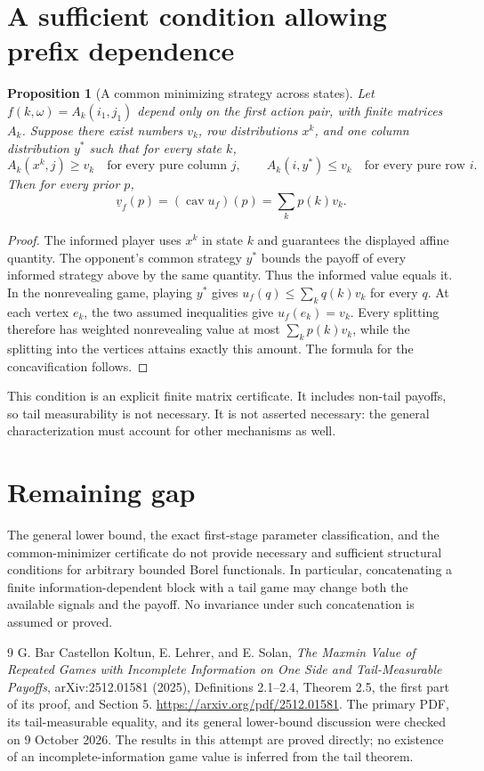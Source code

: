 \documentclass[11pt]{article}
\newtheorem{proposition}[theorem]{Proposition}
\theoremstyle{definition}
\DeclareMathOperator{\cav}{cav}
\begin{document}
\section*{A sufficient condition allowing prefix dependence}
\begin{proposition}[A common minimizing strategy across states]
Let $f(k,\omega)=A_k(i_1,j_1)$ depend only on the first action pair, with finite matrices $A_k$. Suppose there exist numbers $v_k$, row distributions $x^k$, and one column distribution $y^*$ such that for every state $k$,
\[
 A_k(x^k,j)\ge v_k\quad\text{for every pure column }j,
 \qquad
 A_k(i,y^*)\le v_k\quad\text{for every pure row }i.
\]
Then for every prior $p$,
\[
 \underline v_f(p)=(\cav u_f)(p)=\sum_k p(k)v_k.
\]
\end{proposition}
\begin{proof}
The informed player uses $x^k$ in state $k$ and guarantees the displayed affine quantity. The opponent's common strategy $y^*$ bounds the payoff of every informed strategy above by the same quantity. Thus the informed value equals it. In the nonrevealing game, playing $y^*$ gives $u_f(q)\le\sum_kq(k)v_k$ for every $q$. At each vertex $e_k$, the two assumed inequalities give $u_f(e_k)=v_k$. Every splitting therefore has weighted nonrevealing value at most $\sum_kp(k)v_k$, while the splitting into the vertices attains exactly this amount. The formula for the concavification follows.
\end{proof}

This condition is an explicit finite matrix certificate. It includes non-tail payoffs, so tail measurability is not necessary. It is not asserted necessary: the general characterization must account for other mechanisms as well.

\section*{Remaining gap}
The general lower bound, the exact first-stage parameter classification, and the common-minimizer certificate do not provide necessary and sufficient structural conditions for arbitrary bounded Borel functionals. In particular, concatenating a finite information-dependent block with a tail game may change both the available signals and the payoff. No invariance under such concatenation is assumed or proved.

\begin{thebibliography}{9}
 G. Bar Castellon Koltun, E. Lehrer, and E. Solan, \emph{The Maxmin Value of Repeated Games with Incomplete Information on One Side and Tail-Measurable Payoffs}, arXiv:2512.01581 (2025), Definitions 2.1--2.4, Theorem 2.5, the first part of its proof, and Section 5. \url{https://arxiv.org/pdf/2512.01581}. The primary PDF, its tail-measurable equality, and its general lower-bound discussion were checked on 9 October 2026. The results in this attempt are proved directly; no existence of an incomplete-information game value is inferred from the tail theorem.
\end{thebibliography}
\end{document}
